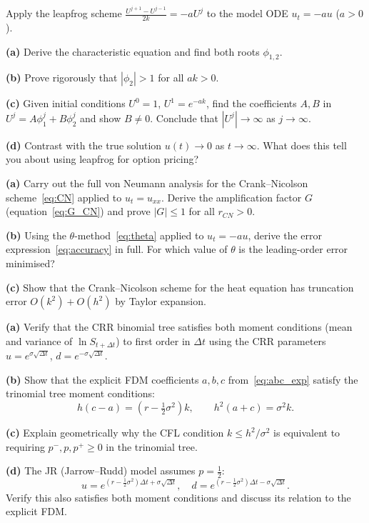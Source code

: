 \documentclass[12pt,a4paper]{article}
\theoremstyle{plain}
\theoremstyle{definition}
\theoremstyle{remark}
\newcommand{\dt}{\Delta t}
\begin{document}
\begin{hwbox}
Apply the leapfrog scheme $\displaystyle\frac{U^{j+1}-U^{j-1}}{2k}=-aU^{j}$
to the model ODE $u_{t}=-au$ ($a>0$).

\textbf{(a)} Derive the characteristic equation and find both roots
$\phi_{1,2}$.

\textbf{(b)} Prove rigorously that $|\phi_{2}|>1$ for all $ak>0$.

\textbf{(c)} Given initial conditions $U^{0}=1$, $U^{1}=e^{-ak}$,
find the coefficients $A,B$ in $U^{j}=A\phi_{1}^{j}+B\phi_{2}^{j}$
and show $B\neq0$.  Conclude that $|U^{j}|\to\infty$ as $j\to\infty$.

\textbf{(d)} Contrast with the true solution $u(t)\to0$ as $t\to\infty$.
What does this tell you about using leapfrog for option pricing?
\end{hwbox}

\begin{hwbox}
\textbf{(a)} Carry out the full von Neumann analysis for the
Crank--Nicolson scheme~\eqref{eq:CN} applied to $u_{t}=u_{xx}$.
Derive the amplification factor $G$ (equation~\eqref{eq:G_CN}) and
prove $|G|\leq1$ for all $r_{CN}>0$.

\textbf{(b)} Using the $\theta$-method~\eqref{eq:theta} applied to
$u_{t}=-au$, derive the error expression~\eqref{eq:accuracy} in full.
For which value of $\theta$ is the leading-order error minimised?

\textbf{(c)} Show that the Crank--Nicolson scheme for the heat equation
has truncation error $O(k^{2})+O(h^{2})$ by Taylor expansion.
\end{hwbox}

\begin{hwbox}
\textbf{(a)} Verify that the CRR binomial tree satisfies both moment
conditions (mean and variance of $\ln S_{t+\dt}$) to first order in
$\dt$ using the CRR parameters $u=e^{\sigma\sqrt{\dt}}$,
$d=e^{-\sigma\sqrt{\dt}}$.

\textbf{(b)} Show that the explicit FDM coefficients $a,b,c$
from~\eqref{eq:abc_exp} satisfy the trinomial tree moment conditions:
\[
  h(c-a)=\left(r-\tfrac{1}{2}\sigma^{2}\right)k,\qquad
  h^{2}(a+c)=\sigma^{2}k.
\]

\textbf{(c)} Explain geometrically why the CFL condition $k\leq h^{2}/\sigma^{2}$
is equivalent to requiring $p^{-},p,p^{+}\geq0$ in the trinomial tree.

\textbf{(d)} The JR (Jarrow--Rudd) model assumes $p=\tfrac{1}{2}$:
\[
  u=e^{(r-\tfrac{1}{2}\sigma^{2})\dt+\sigma\sqrt{\dt}},\quad
  d=e^{(r-\tfrac{1}{2}\sigma^{2})\dt-\sigma\sqrt{\dt}}.
\]
Verify this also satisfies both moment conditions and discuss its
relation to the explicit FDM.
\end{hwbox}
\end{document}
